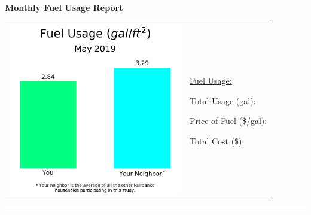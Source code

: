 \documentclass[12pt,a4paper]{article}
\begin{document}
\begin{center}
\textbf{\Huge{\\Monthly Fuel Usage Report}}
\end{center}

\begin{center}
\end{center}

\vspace{12pt}

\begin{tabu}{X[m,c]|X[m,c]}

	\includegraphics[width = 3in]{monthly_fuel_usage.png}
	
	&
	
	\underline{{\reportmonth} {\reportyear} Fuel Usage:}
	
		\begin{description}
		
			\centering
			
			\item Total Usage (gal): {\totalusage}
			
			\item Price of Fuel (\$/gal): {\fuelprice}
			
			\item Total Cost (\$): {\totalcost}
			
		\end{description}
	
	
\end{tabu}

\vspace{12pt}
\rule{\textwidth}{1pt}
\vspace{12pt}
\end{document}
